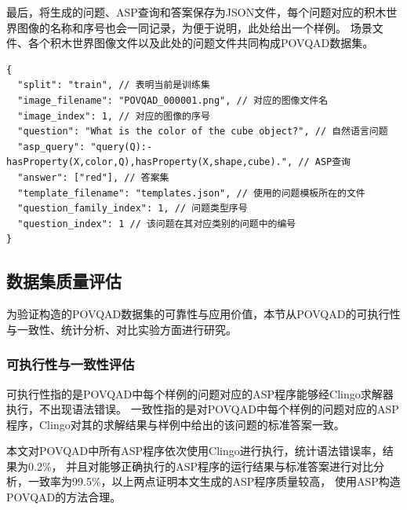 最后，将生成的问题、ASP查询和答案保存为JSON文件，每个问题对应的积木世界图像的名称和序号也会一同记录，为便于说明，此处给出一个样例。
场景文件、各个积木世界图像文件以及此处的问题文件共同构成POVQAD数据集。
\begin{lstlisting}
{
  "split": "train", // 表明当前是训练集
  "image_filename": "POVQAD_000001.png", // 对应的图像文件名
  "image_index": 1, // 对应的图像的序号
  "question": "What is the color of the cube object?", // 自然语言问题
  "asp_query": "query(Q):-hasProperty(X,color,Q),hasProperty(X,shape,cube).", // ASP查询
  "answer": ["red"], // 答案集
  "template_filename": "templates.json", // 使用的问题模板所在的文件
  "question_family_index": 1, // 问题类型序号
  "question_index": 1 // 该问题在其对应类别的问题中的编号
}
\end{lstlisting}
\subsection{数据集质量评估}
为验证构造的POVQAD数据集的可靠性与应用价值，本节从POVQAD的可执行性与一致性、统计分析、对比实验方面进行研究。
\subsubsection{可执行性与一致性评估}
可执行性指的是POVQAD中每个样例的问题对应的ASP程序能够经Clingo求解器执行，不出现语法错误。
一致性指的是对POVQAD中每个样例的问题对应的ASP程序，Clingo对其的求解结果与样例中给出的该问题的标准答案一致。

本文对POVQAD中所有ASP程序依次使用Clingo进行执行，统计语法错误率，结果为0.2\%，
并且对能够正确执行的ASP程序的运行结果与标准答案进行对比分析，一致率为99.5\%，以上两点证明本文生成的ASP程序质量较高，
使用ASP构造POVQAD的方法合理。
